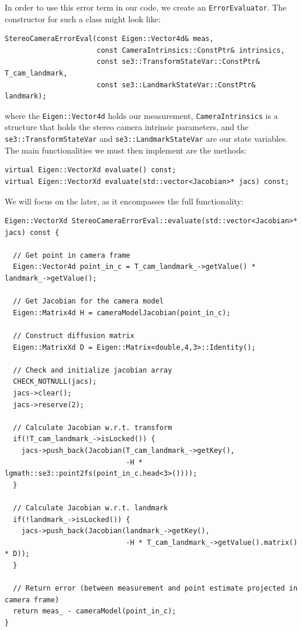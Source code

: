 \documentclass[10pt,letterpaper,fleqn,oneside]{article}
\newcommand{\code}[1]{\texttt{#1}}
\begin{document}
\noindent In order to use this error term in our code, we create an \code{ErrorEvaluator}.
The constructor for such a class might look like:
%
\begin{lstlisting}
StereoCameraErrorEval(const Eigen::Vector4d& meas,
                      const CameraIntrinsics::ConstPtr& intrinsics,
                      const se3::TransformStateVar::ConstPtr& T_cam_landmark,
                      const se3::LandmarkStateVar::ConstPtr& landmark);
\end{lstlisting}
%
where the \code{Eigen::Vector4d} holds our measurement, \code{CameraIntrinsics} is a structure that holds the stereo camera intrinsic parameters, and the \code{se3::TransformStateVar} and \code{se3::LandmarkStateVar} are our state variables.
The main functionalities we must then implement are the methods:
%
\begin{lstlisting}
virtual Eigen::VectorXd evaluate() const;
virtual Eigen::VectorXd evaluate(std::vector<Jacobian>* jacs) const;
\end{lstlisting}
%
We will focus on the later, as it encompasses the full functionality:
%
\begin{lstlisting}
Eigen::VectorXd StereoCameraErrorEval::evaluate(std::vector<Jacobian>* jacs) const {

  // Get point in camera frame
  Eigen::Vector4d point_in_c = T_cam_landmark_->getValue() * landmark_->getValue();

  // Get Jacobian for the camera model
  Eigen::Matrix4d H = cameraModelJacobian(point_in_c);
  
  // Construct diffusion matrix
  Eigen::MatrixXd D = Eigen::Matrix<double,4,3>::Identity();

  // Check and initialize jacobian array
  CHECK_NOTNULL(jacs);
  jacs->clear();
  jacs->reserve(2);

  // Calculate Jacobian w.r.t. transform
  if(!T_cam_landmark_->isLocked()) {
    jacs->push_back(Jacobian(T_cam_landmark_->getKey(), 
                             -H * lgmath::se3::point2fs(point_in_c.head<3>())));
  }

  // Calculate Jacobian w.r.t. landmark
  if(!landmark_->isLocked()) {
    jacs->push_back(Jacobian(landmark_->getKey(),
                             -H * T_cam_landmark_->getValue().matrix() * D));
  }

  // Return error (between measurement and point estimate projected in camera frame)
  return meas_ - cameraModel(point_in_c);
}
\end{lstlisting}
\end{document}
